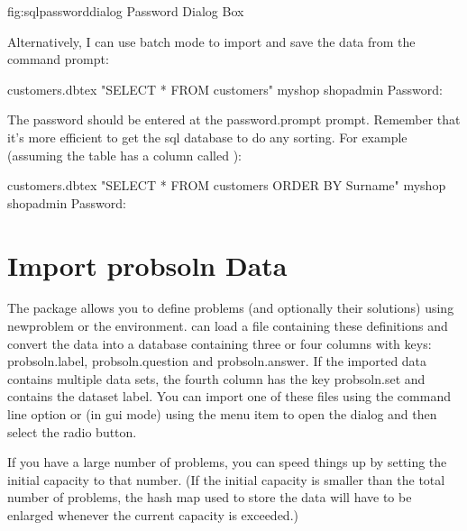 \FloatFig
 {fig:sqlpassworddialog}
 {%
 }
 {Password Dialog Box}

   Alternatively, I can use batch mode to import and save the data 
   from the command prompt:

\begin{terminal}
  customers.dbtex  "SELECT * FROM customers" \continueline
{} myshop  shopadmin
Password:
\end{terminal}

   \ContExplan The password should be entered at the \gls{password.prompt}
   prompt. Remember that it's more efficient to get the \gls{sql}
   database to do any sorting. For example (assuming the table has 
   a column called ):
\begin{terminal}
  customers.dbtex  "SELECT * FROM customers ORDER BY \continueline
Surname"  myshop  shopadmin
Password:
\end{terminal}

\section{Import probsoln Data}\label{sec:importprobsoln}

   The  package allows you to define problems (and 
   optionally their solutions) using \gls{newproblem} or the
    environment.  can load a file
   containing these definitions and convert the  data
   into a  database containing three or four columns
   with keys: \gls{probsoln.label}, 
   \gls{probsoln.question} and
   \gls{probsoln.answer}. If the imported data contains
   multiple  data sets, the fourth column has the
   key \gls{probsoln.set} and contains the dataset label. 
   You can import one of these
   files using the  command line option or (in
   \gls{gui} mode) using the 
   menu item to open the  dialog and then select the 
    radio button. 

   If you have a large number of problems, you can speed things
   up by setting the initial capacity to that number. (If the initial
   capacity is smaller than the total number of problems, the hash map
   used to store the data will have to be enlarged whenever the current
   capacity is exceeded.)

